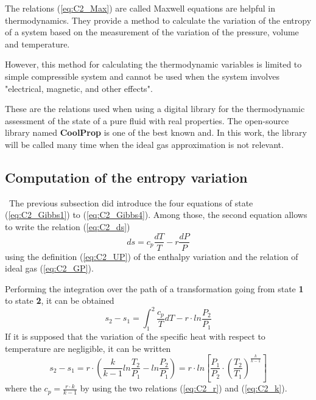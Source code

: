 The relations (\ref{eq:C2_Max}) are called Maxwell equations are helpful in thermodynamics. They provide a method to calculate the variation of the entropy of a system based on the measurement of the variation of the pressure, volume and temperature.

However, this method for calculating the thermodynamic variables is limited to simple compressible system and cannot be used when the system involves "electrical, magnetic, and other effects"\cite{2015}.

These are the relations used when using a digital library for the thermodynamic assessment of the state of a pure fluid with real properties. The open-source library named \textbf{CoolProp}\cite{Bell2014} is one of the best known and. In this work, the library will be called many time when the ideal gas approximation is not relevant.

\subsection{Computation of the entropy variation}
\quad\, The previous subsection did introduce the four equations of state (\ref{eq:C2_Gibbs1}) to (\ref{eq:C2_Gibbs4}). Among those, the second equation allows to write the relation (\ref{eq:C2_ds})
\begin{equation}
ds = c_p\frac{dT}{T} - r\frac{dP}{P}\label{eq:C2_ds}
\end{equation}
using the definition (\ref{eq:C2_UP}) of the enthalpy variation and the relation of ideal gas (\ref{eq:C2_GP}).

Performing the integration over the path of a transformation going from state \textbf{1} to state \textbf{2}, it can be obtained 
\begin{equation}
s_2 - s_1  = \int_1^2\frac{c_p}{T}dT - r\cdot ln\frac{P_2}{P_1}
\end{equation}
If it is supposed that the variation of the specific heat with respect to temperature are negligible, it can be written
\begin{equation}
s_2 - s_1= r\cdot \left(\frac{k}{k-1}ln\frac{T_2}{P_1} - ln\frac{P_2}{P_1}\right) = r\cdot ln\left[\frac{P_1}{P_2}\cdot\left(\frac{T_2}{T_1}\right)^\frac{k}{k-1}\right] \label{eq:C2_Deltas}
\end{equation}
where the $c_p=\frac{r\cdot k}{k-1}$ by using the two relations (\ref{eq:C2_r}) and (\ref{eq:C2_k}).

